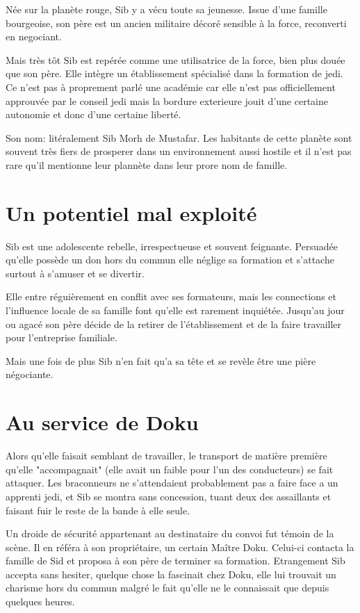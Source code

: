 \documentclass[10pt,a4paper,twoside,twocolumn,openany]{book}
\begin{document}
Née sur la planète rouge, Sib y a vécu toute sa jeunesse. Issue d'une famille
bourgeoise, son père est un ancien militaire décoré sensible à la force, reconverti en negociant.

Mais très tôt Sib est repérée comme une utilisatrice de la force, bien plus douée que son père. Elle intègre
un établissement spécialisé dans la formation de jedi. Ce n'est pas à proprement parlé une académie car elle n'est pas officiellement approuvée par le conseil jedi mais la bordure exterieure jouit d'une certaine autonomie et donc d'une certaine liberté.

\begin{commentbox}{}
Son nom: litéralement Sib Morh de Mustafar. Les habitants de cette planète sont souvent très fiers de prosperer dans un
environnement aussi hostile et il n'est pas rare qu'il mentionne leur plannète dans leur prore nom de famille.
\end{commentbox}

\section{Un potentiel mal exploité}

Sib est une adolescente rebelle, irrespectueuse et souvent feignante. Persuadée qu'elle possède un don hors du commun elle néglige sa formation et s'attache surtout à s'amuser et se divertir.

Elle entre réguièrement en conflit avec ses formateurs, mais les connections et l'influence locale de sa famille font qu'elle est rarement inquiétée. Jusqu'au jour ou agacé son père décide de la retirer de l'établissement et de la faire travailler pour l'entreprise familiale.

Mais une fois de plus Sib n'en fait qu'a sa tête et se revèle être une pière négociante.

\section{Au service de Doku}

Alors qu'elle faisait semblant de travailler, le transport de matière première qu'elle "accompagnait" (elle avait un faible pour l'un des conducteurs) se fait attaquer. Les braconneurs ne s'attendaient probablement pas a faire face a un apprenti jedi, et Sib se montra sans concession, tuant deux des assaillants et faisant fuir le reste de la bande à elle seule.   

Un droide de sécurité appartenant au destinataire du convoi fut témoin de la scène. Il en référa à son propriétaire, un certain Maître Doku. Celui-ci contacta la famille de Sid et proposa à son père de terminer sa formation.
Etrangement Sib accepta sans hesiter, quelque chose la fascinait chez Doku, elle lui trouvait un charisme hors du commun malgré le fait qu'elle ne le connaissait que depuis quelques heures.
\end{document}
